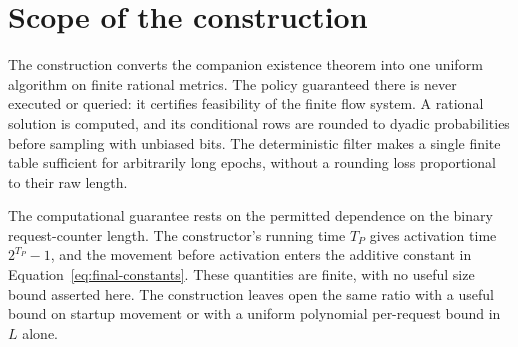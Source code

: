\section{Scope of the construction}\label{sec:conclusion}

The construction converts the companion existence theorem into one uniform
algorithm on finite rational metrics. The policy guaranteed there is never
executed or queried: it certifies feasibility of the finite flow system.
A rational solution is computed, and its conditional rows are rounded to
dyadic probabilities before sampling with unbiased bits. The
deterministic filter makes a single finite table sufficient for arbitrarily
long epochs, without a rounding loss proportional to their raw length.

The computational guarantee rests on the permitted dependence on the
binary request-counter length. The constructor's running time $T_P$ gives
activation time $2^{T_P}-1$, and the movement before activation enters the
additive constant in Equation~\eqref{eq:final-constants}. These quantities
are finite, with no useful size bound asserted here. The construction
leaves open the same ratio with a useful bound on startup movement or with
a uniform polynomial per-request bound in $L$ alone.

